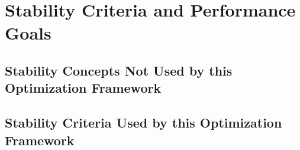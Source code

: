 
\chapter{Stability Criteria and Performance Goals}
\label{ch:Stability}

\section{Stability Concepts Not Used by this Optimization Framework}

\section{Stability Criteria Used by this Optimization Framework}

